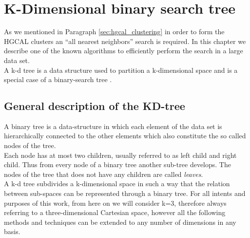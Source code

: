 \chapter{K-Dimensional binary search tree}\label{ch:volume_kd}
As we mentioned in Paragraph \ref{sec:hgcal_clustering} in order to form the HGCAL clusters an ``all nearest neighbors'' search is required. In this chapter we describe one of the known algorithms to efficiently perform the search in a large data set.\\
A k-d tree is a data structure used to partition a k-dimensional space and is a special case of a binary-search tree \cite{kdtree}.

\section{General description of the KD-tree}
A binary tree is a data-structure in which each element of the data set is hierarchically connected to the other elements which also constitute the so called nodes of the tree.\\
Each node has at most two children, usually referred to as left child and right child. Thus from every node of a binary tree another sub-tree develops. The nodes of the tree that does not have any children are called \textit{leaves}.\\
A k-d tree subdivides a k-dimensional space in such a way that the relation between sub-spaces can be represented through a binary tree.
For all intents and purposes of this work, from here on we will consider k=3, therefore always referring to a three-dimensional Cartesian space, however all the following methods and techniques can be extended to any number of dimensions in any basis.
  

